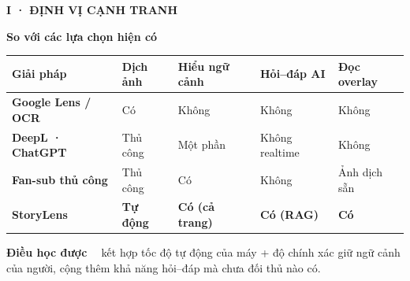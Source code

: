 \documentclass[aspectratio=169,10pt]{beamer}
\newcommand{\kick}[1]{{\headfont\bfseries\footnotesize\textcolor{mred}{\MakeUppercase{#1}}}}
\newcommand{\slidehead}[2]{%
  \kick{#1}\par\vspace{0.6mm}%
  {\headfont\bfseries\LARGE\textcolor{ink}{#2}}\par\vspace{1.2mm}}
\newcommand{\arr}{\textcolor{mred}{\,\raisebox{0.1ex}{$\rightarrow$}\,}}
\begin{document}
\begin{frame}
\slidehead{I · Định vị cạnh tranh}{So với các lựa chọn hiện có}
\vspace{1mm}
\renewcommand{\arraystretch}{1.55}
\small
\begin{tabular}{|>{\raggedright\arraybackslash}p{3.5cm}|>{\centering\arraybackslash}p{2cm}|>{\centering\arraybackslash}p{2.6cm}|>{\centering\arraybackslash}p{2.4cm}|>{\centering\arraybackslash}p{2.4cm}|}
\hline
\rowcolor{ink}
{\color{white}\headfont\bfseries Giải pháp} & {\color{white}\headfont\bfseries Dịch ảnh} & {\color{white}\headfont\bfseries Hiểu ngữ cảnh} & {\color{white}\headfont\bfseries Hỏi–đáp AI} & {\color{white}\headfont\bfseries Đọc overlay}\\
\hline
\headfont\bfseries Google Lens / OCR & Có & \textcolor{slate}{Không} & \textcolor{slate}{Không} & \textcolor{slate}{Không}\\
\hline
\rowcolor{cream}
\headfont\bfseries DeepL · ChatGPT & Thủ công & Một phần & \textcolor{slate}{Không realtime} & \textcolor{slate}{Không}\\
\hline
\headfont\bfseries Fan-sub thủ công & Thủ công & Có & \textcolor{slate}{Không} & Ảnh dịch sẵn\\
\hline
\rowcolor{mred}
{\color{white}\headfont\bfseries StoryLens} & {\color{white}\bfseries Tự động} & {\color{white}\bfseries Có (cả trang)} & {\color{white}\bfseries Có (RAG)} & {\color{white}\bfseries Có}\\
\hline
\end{tabular}
\vspace{2mm}
\begin{tcolorbox}[darkcard]\small
{\headfont\bfseries\color{gold}Điều học được \arr\ }kết hợp tốc độ tự động của máy + độ chính xác giữ ngữ cảnh của người, cộng thêm khả năng hỏi–đáp mà chưa đối thủ nào có.
\end{tcolorbox}
\end{frame}
\end{document}
